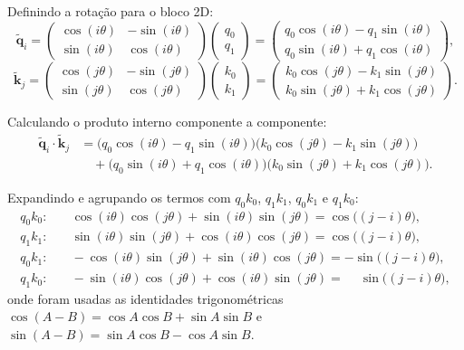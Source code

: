 \documentclass{dlproblemset}
\begin{document}
Definindo a rotação para o bloco 2D:
\[
  \tilde{\mathbf{q}}_i =
  \begin{pmatrix}\cos(i\theta) & -\sin(i\theta) \\ \sin(i\theta) & \cos(i\theta)\end{pmatrix}
  \begin{pmatrix}q_0\\q_1\end{pmatrix}
  = \begin{pmatrix}q_0\cos(i\theta) - q_1\sin(i\theta) \\ q_0\sin(i\theta) + q_1\cos(i\theta)\end{pmatrix},
\]
\[
  \tilde{\mathbf{k}}_j =
  \begin{pmatrix}\cos(j\theta) & -\sin(j\theta) \\ \sin(j\theta) & \cos(j\theta)\end{pmatrix}
  \begin{pmatrix}k_0\\k_1\end{pmatrix}
  = \begin{pmatrix}k_0\cos(j\theta) - k_1\sin(j\theta) \\ k_0\sin(j\theta) + k_1\cos(j\theta)\end{pmatrix}.
\]

Calculando o produto interno componente a componente:
\begin{align*}
  \tilde{\mathbf{q}}_i \cdot \tilde{\mathbf{k}}_j
  &= \bigl(q_0\cos(i\theta) - q_1\sin(i\theta)\bigr)\bigl(k_0\cos(j\theta) - k_1\sin(j\theta)\bigr) \\
  &\quad + \bigl(q_0\sin(i\theta) + q_1\cos(i\theta)\bigr)\bigl(k_0\sin(j\theta) + k_1\cos(j\theta)\bigr).
\end{align*}

Expandindo e agrupando os termos com $q_0 k_0$, $q_1 k_1$, $q_0 k_1$ e $q_1 k_0$:
\begin{align*}
  q_0 k_0: &\quad \cos(i\theta)\cos(j\theta) + \sin(i\theta)\sin(j\theta) = \cos\bigl((j-i)\theta\bigr), \\
  q_1 k_1: &\quad \sin(i\theta)\sin(j\theta) + \cos(i\theta)\cos(j\theta) = \cos\bigl((j-i)\theta\bigr), \\
  q_0 k_1: &\quad -\cos(i\theta)\sin(j\theta) + \sin(i\theta)\cos(j\theta) = -\sin\bigl((j-i)\theta\bigr), \\
  q_1 k_0: &\quad -\sin(i\theta)\cos(j\theta) + \cos(i\theta)\sin(j\theta) = \phantom{-}\sin\bigl((j-i)\theta\bigr),
\end{align*}
onde foram usadas as identidades trigonométricas
$\cos(A-B) = \cos A\cos B + \sin A\sin B$ e
$\sin(A-B) = \sin A\cos B - \cos A\sin B$.
\end{document}
